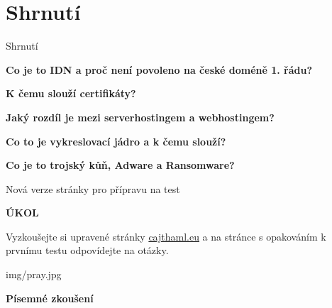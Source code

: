 \documentclass[aspectratio=1610]{beamer}
\begin{document}
\section{Shrnutí}
\begin{frame}{Shrnutí}
    \begin{cardTiny}
        \begin{center}
            \textbf{Co je to IDN a proč není povoleno na české doméně 1. řádu?}
        \end{center}
    \end{cardTiny}

    \begin{cardTiny}
        \begin{center}
        \textbf{K čemu slouží certifikáty?}
        \end{center}
    \end{cardTiny}

    \begin{cardTiny}
        \begin{center}
        \textbf{Jaký rozdíl je mezi serverhostingem a webhostingem?}
        \end{center}
    \end{cardTiny}

    \begin{cardTiny}
        \begin{center}
        \textbf{Co to je vykreslovací jádro a k čemu slouží?}
        \end{center}
    \end{cardTiny}

    \begin{cardTiny}
        \begin{center}
        \textbf{Co je to trojský kůň, Adware a Ransomware?}
        \end{center}
    \end{cardTiny}
\end{frame}


\begin{frame}{Nová verze stránky pro přípravu na test}
    \begin{cardTiny}
        \begin{center}
            \textbf{ÚKOL}
        \end{center}
        \begin{flushleft}
            Vyzkoušejte si upravené stránky \href{https://cajthaml.eu}{cajthaml.eu} a na stránce s opakováním k prvnímu testu odpovídejte na otázky.
        \end{flushleft}
    \end{cardTiny}
\end{frame}

\begin{frameImg}[width]{img/pray.jpg}
    \vspace*{60mm}
    \begin{cardTiny}
        \vspace*{\fill}
        \begin{center}
            \textbf{Písemné zkoušení}
        \end{center}
    \end{cardTiny}
\end{frameImg}
\end{document}
